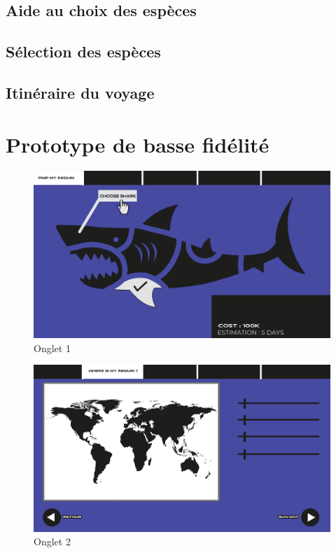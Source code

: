 \documentclass{article}
\begin{document}
\subsection{Aide au choix des espèces}

\subsection{Sélection des espèces}

\subsection{Itinéraire du voyage}

\newpage
\section{Prototype de basse fidélité}

\begin{figure}[!h]
	\centering
	\includegraphics[width=14.4cm]{assets/prototype/basse/onglet1}
	\caption{\label{assets/prototype/basse/onglet1} Onglet 1}
\end{figure}

\vspace{0.3cm}

\begin{figure}[!h]
	\centering
	\includegraphics[width=14.4cm]{assets/prototype/basse/onglet2}
	\caption{\label{assets/prototype/basse/onglet2} Onglet 2}
\end{figure}
\end{document}
